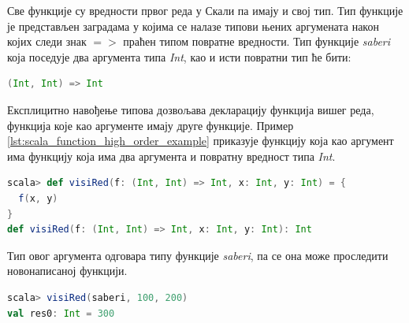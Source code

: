 \documentclass[12pt,oneside]{memoir}
\begin{document}
Све функције су вредности првог реда у Скали па имају и свој тип. Тип функције је представљен заградама у којима се налазе типови њених аргумената након којих следи знак $=>$ праћен типом повратне вредности. Тип функције \textit{saberi} која поседује два аргумента типа \textit{Int}, као и исти повратни тип ће бити:

\begin{lstlisting}[language=Scala, caption={Тип функције \textit{saberi}}, label={lst:scala_function_add_example_type}]
(Int, Int) => Int
\end{lstlisting}

Експлицитно навођење типова дозвољава декларацију функција вишег реда, функција које као аргументе имају друге функције. Пример \ref{lst:scala_function_high_order_example} приказује функцију која као аргумент има функцију која има два аргумента и повратну вредност типа \textit{Int}.

\begin{lstlisting}[language=Scala, caption={Функција вишег реда}, label={lst:scala_function_high_order_example}]
scala> def visiRed(f: (Int, Int) => Int, x: Int, y: Int) = {
  f(x, y)
}
def visiRed(f: (Int, Int) => Int, x: Int, y: Int): Int
\end{lstlisting}

Тип овог аргумента одговара типу функције \textit{saberi}, па се она може проследити новонаписаној функцији.

\begin{lstlisting}[language=Scala, caption={Прослеђивање функције функцији}, label={lst:scala_function_add_high_order}]
scala> visiRed(saberi, 100, 200)
val res0: Int = 300
\end{lstlisting}


%
%
%
\end{document}
